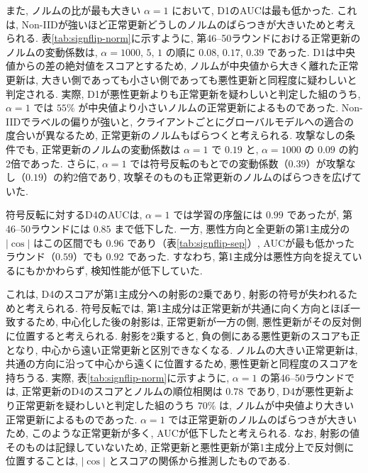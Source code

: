 \documentclass[a4j, twocolumn, dvipdfmx]{jsarticle}
\begin{document}
また, ノルムの比が最も大きい $\alpha=1$ において, D1のAUCは最も低かった. これは, Non-IIDが強いほど正常更新どうしのノルムのばらつきが大きいためと考えられる. 表\ref{tab:signflip-norm}に示すように, 第46--50ラウンドにおける正常更新のノルムの変動係数は, $\alpha=1000,\,5,\,1$ の順に $0.08$, $0.17$, $0.39$ であった. D1は中央値からの差の絶対値をスコアとするため, ノルムが中央値から大きく離れた正常更新は, 大きい側であっても小さい側であっても悪性更新と同程度に疑わしいと判定される. 実際, D1が悪性更新よりも正常更新を疑わしいと判定した組のうち, $\alpha=1$ では $55\%$ が中央値より小さいノルムの正常更新によるものであった. Non-IIDでラベルの偏りが強いと, クライアントごとにグローバルモデルへの適合の度合いが異なるため, 正常更新のノルムもばらつくと考えられる. 攻撃なしの条件でも, 正常更新のノルムの変動係数は $\alpha=1$ で $0.19$ と, $\alpha=1000$ の $0.09$ の約2倍であった. さらに, $\alpha=1$ では符号反転のもとでの変動係数（$0.39$）が攻撃なし（$0.19$）の約2倍であり, 攻撃そのものも正常更新のノルムのばらつきを広げていた.

符号反転に対するD4のAUCは, $\alpha=1$ では学習の序盤には $0.99$ であったが, 第46--50ラウンドには $0.85$ まで低下した. 一方, 悪性方向と全更新の第1主成分の $|\cos|$ はこの区間でも $0.96$ であり（表\ref{tab:signflip-sep}）, AUCが最も低かったラウンド（$0.59$）でも $0.92$ であった. すなわち, 第1主成分は悪性方向を捉えているにもかかわらず, 検知性能が低下していた.

これは, D4のスコアが第1主成分への射影の2乗であり, 射影の符号が失われるためと考えられる. 符号反転では, 第1主成分は正常更新が共通に向く方向とほぼ一致するため, 中心化した後の射影は, 正常更新が一方の側, 悪性更新がその反対側に位置すると考えられる. 射影を2乗すると, 負の側にある悪性更新のスコアも正となり, 中心から遠い正常更新と区別できなくなる. ノルムの大きい正常更新は, 共通の方向に沿って中心から遠くに位置するため, 悪性更新と同程度のスコアを持ちうる. 実際, 表\ref{tab:signflip-norm}に示すように, $\alpha=1$ の第46--50ラウンドでは, 正常更新のD4のスコアとノルムの順位相関は $0.78$ であり, D4が悪性更新より正常更新を疑わしいと判定した組のうち $70\%$ は, ノルムが中央値より大きい正常更新によるものであった. $\alpha=1$ では正常更新のノルムのばらつきが大きいため, このような正常更新が多く, AUCが低下したと考えられる. なお, 射影の値そのものは記録していないため, 正常更新と悪性更新が第1主成分上で反対側に位置することは, $|\cos|$ とスコアの関係から推測したものである.
\end{document}
